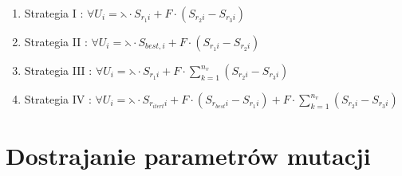 \begin{enumerate}
\item Strategia I : $ \forall U_{i} = \leftthreetimes \cdot S_{r_{1}i} + F \cdot (S_{r_{2}i} - S_{r_{3}i})$
\item Strategia II : $ \forall U_{i} = \leftthreetimes \cdot  S_{best,i} + F \cdot (S_{r_{1}i} - S_{r_{2}i}) $
\item Strategia III : $ \forall U_{i} = \leftthreetimes \cdot  S_{r_{1}i} +  F \cdot \sum_{k=1}^{n_{v}}(S_{r_{2}i} - S_{r_{3}i}) $
\item Strategia IV : $ \forall U_{i} = \leftthreetimes \cdot S_{r_{itert}i} +  F \cdot (S_{r_{best}i} - S_{r_{1}i}) +  F \cdot \sum_{k=1}^{n_{v}}(S_{r_{2}i} - S_{r_{3}i}) $
\end{enumerate}
\par


\section{Dostrajanie parametrów mutacji}\label{sec:kompilacja}


